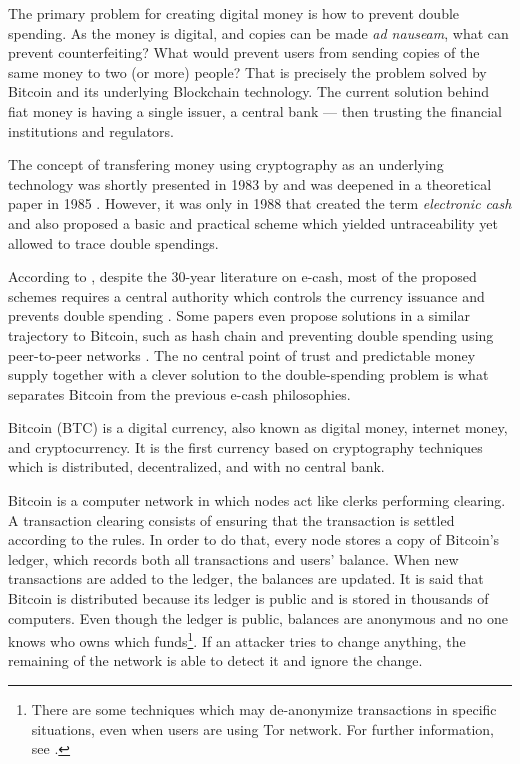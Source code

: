 The primary problem for creating digital money is how to prevent double spending. As the money is digital, and copies can be made \textit{ad nauseam}, what can prevent counterfeiting? What would prevent users from sending copies of the same money to two (or more) people? That is precisely the problem solved by Bitcoin and its underlying Blockchain technology. The current solution behind fiat money is having a single issuer, a central bank --- then trusting the financial institutions and regulators.

The concept of transfering money using cryptography as an underlying technology was shortly presented in 1983 by \citet{chaum1983blind} and was deepened in a theoretical paper in 1985 \citep{chaum1985security}. However, it was only in 1988 that \citet{chaum1988untraceable} created the term \emph{electronic cash} and also proposed a basic and practical scheme which yielded untraceability yet allowed to trace double spendings.

According to \citet{barber2012bitter}, despite the 30-year literature on e-cash, most of the proposed schemes requires a central authority which controls the currency issuance and prevents double spending \citep{chaum1983blind, okamoto1995efficient, camenisch2005compact, canard2007divisible}. Some papers even propose solutions in a similar trajectory to Bitcoin, such as hash chain \citep{zongkai2004new} and preventing double spending using peer-to-peer networks \citep{osipkov2007combating, hoepman2007distributed}. The no central point of trust and predictable money supply together with a clever solution to the double-spending problem is what separates Bitcoin from the previous e-cash philosophies.

Bitcoin (BTC) is a digital currency, also known as digital money, internet money, and cryptocurrency. It is the first currency based on cryptography techniques which is distributed, decentralized, and with no central bank.

Bitcoin is a computer network in which nodes act like clerks performing clearing. A transaction clearing consists of ensuring that the transaction is settled according to the rules. In order to do that, every node stores a copy of Bitcoin's ledger, which records both all transactions and users' balance. When new transactions are added to the ledger, the balances are updated. It is said that Bitcoin is distributed because its ledger is public and is stored in thousands of computers. Even though the ledger is public, balances are anonymous and no one knows who owns which funds\footnote{There are some techniques which may de-anonymize transactions in specific situations, even when users are using Tor network. For further information, see \citet{shentu2015research, biryukov2014deanonymisation, jawaheri2018small}.}. If an attacker tries to change anything, the remaining of the network is able to detect it and ignore the change.

